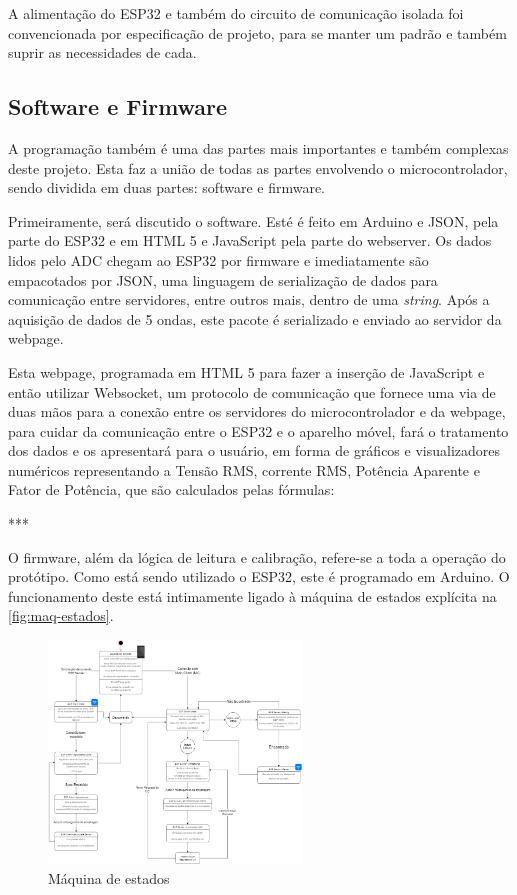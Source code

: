 A alimentação do ESP32 e também do circuito de comunicação isolada foi convencionada por especificação de projeto, para se manter um padrão e também suprir as necessidades de cada.

\subsection{Software e Firmware}\label{softfirm}

A programação também é uma das partes mais importantes e também complexas deste projeto. Esta faz a união de todas as partes envolvendo o microcontrolador, sendo dividida em duas partes: software e firmware.

Primeiramente, será discutido o software. Esté é feito em Arduino e JSON, pela parte do ESP32 e em HTML 5 e JavaScript pela parte do webserver. Os dados lidos pelo \gls{ADC} chegam ao ESP32 por firmware e imediatamente são empacotados por JSON, uma linguagem de serialização de dados para comunicação entre servidores, entre outros mais, dentro de uma \textit{string}. Após a aquisição de dados de 5 ondas, este pacote é serializado e enviado ao servidor da webpage.

Esta webpage, programada em HTML 5 para fazer a inserção de JavaScript e então utilizar Websocket, um protocolo de comunicação que fornece uma via de duas mãos para a conexão entre os servidores do microcontrolador e da webpage, para cuidar da comunicação entre o ESP32 e o aparelho móvel, fará o tratamento dos dados e os apresentará para o usuário, em forma de gráficos e visualizadores numéricos representando a Tensão RMS, corrente RMS, Potência Aparente e Fator de Potência, que são calculados pelas fórmulas:


***


O firmware, além da lógica de leitura e calibração, refere-se a toda a operação do protótipo. Como está sendo utilizado o ESP32, este é programado em Arduino. O funcionamento deste está intimamente ligado à máquina de estados explícita na \autoref{fig:maq-estados}.

\begin{figure}[htb!]
    \caption{Máquina de estados}
    \label{fig:maq-estados}
    \includegraphics[width=0.6\textwidth]{figuras/maq-estados.png}
    \fonte{}
\end{figure}

